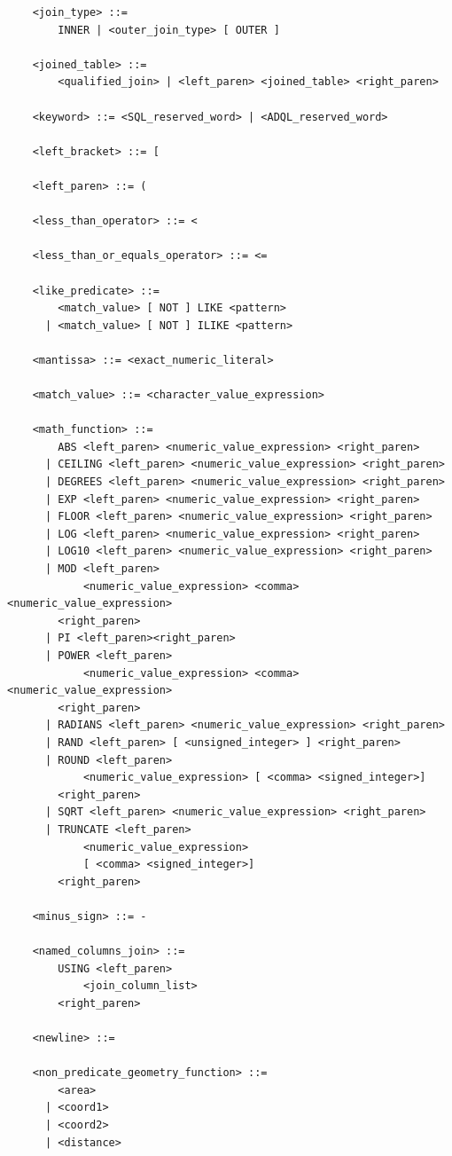 \documentclass[11pt,a4paper]{ivoa}
\begin{document}
\begin{verbatim}
    <join_type> ::=
        INNER | <outer_join_type> [ OUTER ]

    <joined_table> ::=
        <qualified_join> | <left_paren> <joined_table> <right_paren>

    <keyword> ::= <SQL_reserved_word> | <ADQL_reserved_word>

    <left_bracket> ::= [

    <left_paren> ::= (

    <less_than_operator> ::= <

    <less_than_or_equals_operator> ::= <=

    <like_predicate> ::=
        <match_value> [ NOT ] LIKE <pattern>
      | <match_value> [ NOT ] ILIKE <pattern>

    <mantissa> ::= <exact_numeric_literal>

    <match_value> ::= <character_value_expression>

    <math_function> ::=
        ABS <left_paren> <numeric_value_expression> <right_paren>
      | CEILING <left_paren> <numeric_value_expression> <right_paren>
      | DEGREES <left_paren> <numeric_value_expression> <right_paren>
      | EXP <left_paren> <numeric_value_expression> <right_paren>
      | FLOOR <left_paren> <numeric_value_expression> <right_paren>
      | LOG <left_paren> <numeric_value_expression> <right_paren>
      | LOG10 <left_paren> <numeric_value_expression> <right_paren>
      | MOD <left_paren>
            <numeric_value_expression> <comma> <numeric_value_expression>
        <right_paren>
      | PI <left_paren><right_paren>
      | POWER <left_paren>
            <numeric_value_expression> <comma> <numeric_value_expression>
        <right_paren>
      | RADIANS <left_paren> <numeric_value_expression> <right_paren>
      | RAND <left_paren> [ <unsigned_integer> ] <right_paren>
      | ROUND <left_paren>
            <numeric_value_expression> [ <comma> <signed_integer>]
        <right_paren>
      | SQRT <left_paren> <numeric_value_expression> <right_paren>
      | TRUNCATE <left_paren>
            <numeric_value_expression>
            [ <comma> <signed_integer>]
        <right_paren>

    <minus_sign> ::= -

    <named_columns_join> ::=
        USING <left_paren>
            <join_column_list>
        <right_paren>

    <newline> ::=

    <non_predicate_geometry_function> ::=
        <area>
      | <coord1>
      | <coord2>
      | <distance>


\end{verbatim}
\end{document}
